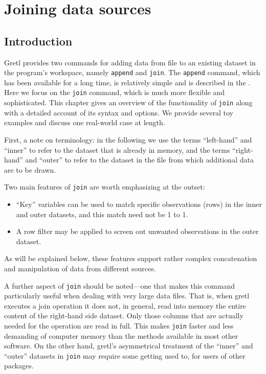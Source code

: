\chapter{Joining data sources}
\label{chap:join}

\section{Introduction}

Gretl provides two commands for adding data from file to an existing
dataset in the program's workspace, namely \texttt{append} and
\texttt{join}. The \texttt{append} command, which has been available
for a long time, is relatively simple and is described in the
\GCR. Here we focus on the \texttt{join} command, which is much more
flexible and sophisticated. This chapter gives an overview of the
functionality of \texttt{join} along with a detailed account of its
syntax and options. We provide several toy examples and discuss one
real-world case at length.

First, a note on terminology: in the following we use the terms 
``left-hand'' and ``inner'' to refer to the dataset that is already in
memory, and the terms ``right-hand'' and ``outer'' to refer to the
dataset in the file from which additional data are to be drawn. 

Two main features of \texttt{join} are worth emphasizing at the
outset:
\begin{itemize}
\item ``Key'' variables can be used to match specific observations
  (rows) in the inner and outer datasets, and this match need not be
  1 to 1.
\item A row filter may be applied to screen out unwanted observations
  in the outer dataset.
\end{itemize}

As will be explained below, these features support rather complex
concatenation and manipulation of data from different sources.

A further aspect of \texttt{join} should be noted---one that makes
this command particularly useful when dealing with very large data
files.  That is, when gretl executes a join operation it does not, in
general, read into memory the entire content of the right-hand side
dataset.  Only those columns that are actually needed for the
operation are read in full. This makes \texttt{join} faster and less
demanding of computer memory than the methods available in most other
software. On the other hand, gretl's asymmetrical treatment of the
``inner'' and ``outer'' datasets in \texttt{join} may require some
getting used to, for users of other packages.

